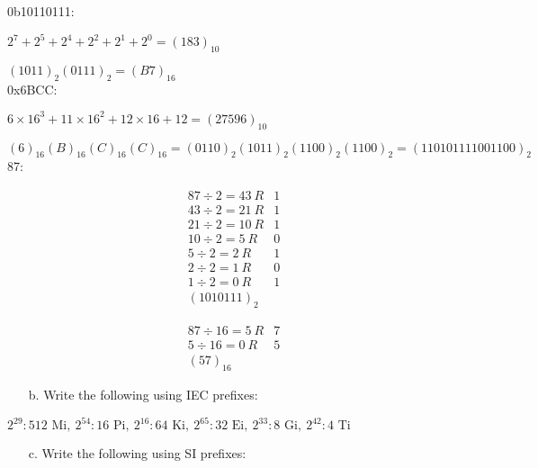\documentclass[12pt]{article}
\begin{document}
    \newpage
    \noindent 0b10110111:
    \par $2^{7} + 2^{5} + 2^{4} + 2^{2} + 2^{1} + 2^{0} = \boxed{(183)_{10}}$
    \par $(1011)_{2}(0111)_{2} = \boxed{(B7)_{16}}$ \\
    0x6BCC:
    \par $6 \times 16^{3} + 11 \times 16^{2} + 12 \times 16 + 12 = \boxed{(27596)_{10}}$
    \par $(6)_{16}(B)_{16}(C)_{16}(C)_{16} =
    (0110)_{2}(1011)_{2}(1100)_{2}(1100)_{2} = \boxed{(110101111001100)_{2}}$ \\
    87:
    \\
    \begin{minipage}{0.5\linewidth}
        \begin{align*}
            87 \div 2 = 43\ R&1 \\
            43 \div 2 = 21\ R&1 \\
            21 \div 2 = 10\ R&1 \\
            10 \div 2 = 5\ R&0 \\
            5 \div 2 = 2\ R&1 \\
            2 \div 2 = 1\ R&0 \\
            1 \div 2 = 0\ R&1 \\
            \boxed{(1010111)_{2}}
        \end{align*}
    \end{minipage}
    \begin{minipage}{0.5\linewidth}
        \begin{align*}
            87 \div 16 = 5\ R&7 \\
            5 \div 16 = 0\ R&5 \\
            \boxed{(57)_{16}}
        \end{align*}
    \end{minipage}
    \begin{itemize}
        \item[b.] Write the following using IEC prefixes:
    \end{itemize}
    \par $2^{29}: \boxed{\text{512 Mi}},\ 2^{54}: \boxed{\text{16 Pi}},\
    2^{16}: \boxed{\text{64
    Ki}},\ 2^{65}: \boxed{\text{32 Ei}},\ 2^{33}: \boxed{\text{8 Gi}},\
    2^{42}: \boxed{\text{4 Ti}}$
    \begin{itemize}
        \item[c.] Write the following using SI prefixes:
    \end{itemize}
\end{document}
